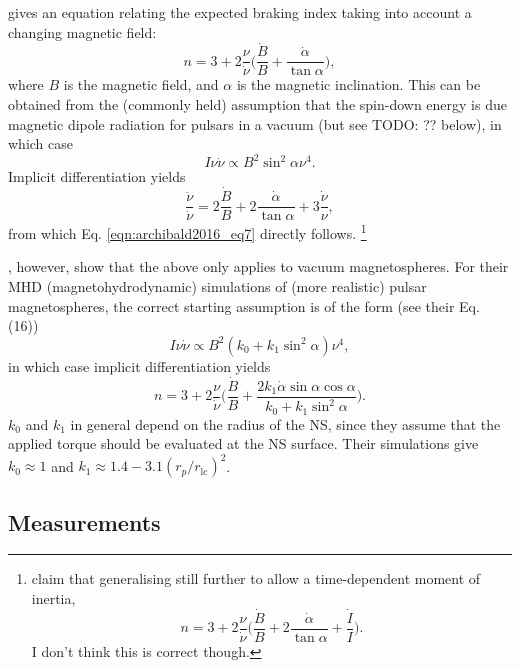 \documentclass{book}
\newcommand{\todo}[1]{{\color{red}TODO: {#1}}}
\newcommand{\rL}{r_\text{lc}} %
\begin{document}
\citet[][Eq. (7)]{Archibald2016} gives an equation relating the expected braking index taking into account a changing magnetic field:
\begin{equation}
  n = 3 + 2\frac{\nu}{\dot{\nu}} \bigg( \frac{\dot{B}}{B} + \frac{\dot{\alpha}}{\tan\alpha} \bigg),
  \label{eqn:archibald2016_eq7}
\end{equation}
where $B$ is the magnetic field, and $\alpha$ is the magnetic inclination.
This can be obtained from the (commonly held) assumption that the spin-down energy is due magnetic dipole radiation for pulsars in a vacuum (but see \todo{??} below), in which case
\begin{equation}
  I \nu \dot{\nu} \propto B^2 \sin^2\alpha \nu^4.
\end{equation}
Implicit differentiation yields
\begin{equation}
  \frac{\ddot{\nu}}{\dot{\nu}} = 2\frac{\dot{B}}{B} + 2\frac{\dot{\alpha}}{\tan\alpha} + 3\frac{\dot{\nu}}{\nu},
\end{equation}
from which Eq. \eqref{eqn:archibald2016_eq7} directly follows.
\footnote{\citet[cf.][]{Li2024} claim that generalising still further to allow a time-dependent moment of inertia,
\[
  n = 3 + 2\frac{\nu}{\dot{\nu}} \bigg( \frac{\dot{B}}{B} + 2\frac{\dot{\alpha}}{\tan\alpha} + \frac{\dot{I}}{I} \bigg).
\]
I don't think this is correct though.}

\citet{Philippov2014}, however, show that the above only applies to vacuum magnetospheres.
For their MHD (magnetohydrodynamic) simulations of (more realistic) pulsar magnetospheres, the correct starting assumption is of the form (see their Eq. (16))
\begin{equation}
  I \nu \dot{\nu} \propto B^2 (k_0 + k_1 \sin^2 \alpha) \nu^4,
\end{equation}
in which case implicit differentiation yields
\begin{equation}
  n = 3 + 2\frac{\nu}{\dot{\nu}} \bigg( \frac{\dot{B}}{B} + \frac{2 k_1 \dot{\alpha} \sin\alpha \cos\alpha}{k_0 + k_1 \sin^2\alpha} \bigg).
\end{equation}
$k_0$ and $k_1$ in general depend on the radius of the NS, since they assume that the applied torque should be evaluated at the NS surface.
Their simulations give $k_0 \approx 1$ and $k_1 \approx 1.4 - 3.1(r_p/\rL)^2$.

\subsection{Measurements}
\end{document}
